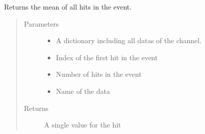 \documentclass[letterpaper,10pt,english]{sphinxmanual}
\begin{document}
\begin{fulllineitems}
\label{\detokenize{autodocs/data:listmode.data.mean_combinator}}
\sphinxAtStartPar
Returns the mean of all hits in the event.
\begin{quote}\begin{description}
\item[{Parameters}] \leavevmode\begin{itemize}
\item {} 
\sphinxAtStartPar
{} \textendash{} A dictionary including all datas of the channel.

\item {} 
\sphinxAtStartPar
{} \textendash{} Index of the first hit in the event

\item {} 
\sphinxAtStartPar
{} \textendash{} Number of hits in the event

\item {} 
\sphinxAtStartPar
{} \textendash{} Name of the data

\end{itemize}

\item[{Returns}] \leavevmode
\sphinxAtStartPar
A single value for the hit

\end{description}\end{quote}

\end{fulllineitems}

\end{document}
